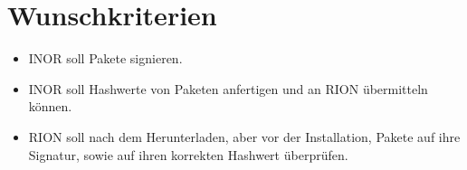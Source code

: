 \section{Wunschkriterien}
\begin{itemize}
	\item INOR soll Pakete signieren.
	\item INOR soll Hashwerte von Paketen anfertigen und an RION übermitteln können.
	\item RION soll nach dem Herunterladen, aber vor der Installation, Pakete auf ihre Signatur, sowie auf ihren korrekten Hashwert überprüfen.

\end{itemize}
